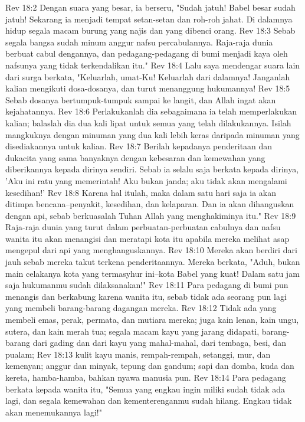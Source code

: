 Rev 18:2  Dengan suara yang besar, ia berseru, "Sudah jatuh! Babel besar sudah jatuh! Sekarang ia menjadi tempat setan-setan dan roh-roh jahat. Di dalamnya hidup segala macam burung yang najis dan yang dibenci orang.
Rev 18:3  Sebab segala bangsa sudah minum anggur nafsu percabulannya. Raja-raja dunia berbuat cabul dengannya, dan pedagang-pedagang di bumi menjadi kaya oleh nafsunya yang tidak terkendalikan itu."
Rev 18:4  Lalu saya mendengar suara lain dari surga berkata, "Keluarlah, umat-Ku! Keluarlah dari dalamnya! Janganlah kalian mengikuti dosa-dosanya, dan turut menanggung hukumannya!
Rev 18:5  Sebab dosanya bertumpuk-tumpuk sampai ke langit, dan Allah ingat akan kejahatannya.
Rev 18:6  Perlakukanlah dia sebagaimana ia telah memperlakukan kalian; balaslah dia dua kali lipat untuk semua yang telah dilakukannya. Isilah mangkuknya dengan minuman yang dua kali lebih keras daripada minuman yang disediakannya untuk kalian.
Rev 18:7  Berilah kepadanya penderitaan dan dukacita yang sama banyaknya dengan kebesaran dan kemewahan yang diberikannya kepada dirinya sendiri. Sebab ia selalu saja berkata kepada dirinya, 'Aku ini ratu yang memerintah! Aku bukan janda; aku tidak akan mengalami kesedihan!'
Rev 18:8  Karena hal itulah, maka dalam satu hari saja ia akan ditimpa bencana--penyakit, kesedihan, dan kelaparan. Dan ia akan dihanguskan dengan api, sebab berkuasalah Tuhan Allah yang menghakiminya itu."
Rev 18:9  Raja-raja dunia yang turut dalam perbuatan-perbuatan cabulnya dan nafsu wanita itu akan menangisi dan meratapi kota itu apabila mereka melihat asap mengepul dari api yang menghanguskannya.
Rev 18:10  Mereka akan berdiri dari jauh sebab mereka takut terkena penderitaannya. Mereka berkata, "Aduh, bukan main celakanya kota yang termasyhur ini--kota Babel yang kuat! Dalam satu jam saja hukumanmu sudah dilaksanakan!"
Rev 18:11  Para pedagang di bumi pun menangis dan berkabung karena wanita itu, sebab tidak ada seorang pun lagi yang membeli barang-barang dagangan mereka.
Rev 18:12  Tidak ada yang membeli emas, perak, permata, dan mutiara mereka; juga kain lenan, kain ungu, sutera, dan kain merah tua; segala macam kayu yang jarang didapati, barang-barang dari gading dan dari kayu yang mahal-mahal, dari tembaga, besi, dan pualam;
Rev 18:13  kulit kayu manis, rempah-rempah, setanggi, mur, dan kemenyan; anggur dan minyak, tepung dan gandum; sapi dan domba, kuda dan kereta, hamba-hamba, bahkan nyawa manusia pun.
Rev 18:14  Para pedagang berkata kepada wanita itu, "Semua yang engkau ingin miliki sudah tidak ada lagi, dan segala kemewahan dan kementerenganmu sudah hilang. Engkau tidak akan menemukannya lagi!"
